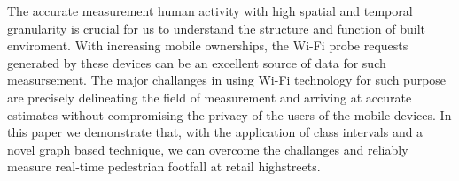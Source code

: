 The accurate measurement human activity with high spatial and temporal granularity is crucial for us to understand the structure and function of built enviroment.
With increasing mobile ownerships, the Wi-Fi probe requests generated by these devices can be an excellent source of data for such measursement.
The major challanges in using Wi-Fi technology for such purpose are precisely delineating the field of measurement and arriving at accurate estimates without compromising the privacy of the users of the mobile devices.
In this paper we demonstrate that, with the application of class intervals and a novel graph based technique, we can overcome the challanges and reliably measure real-time pedestrian footfall at retail highstreets.

